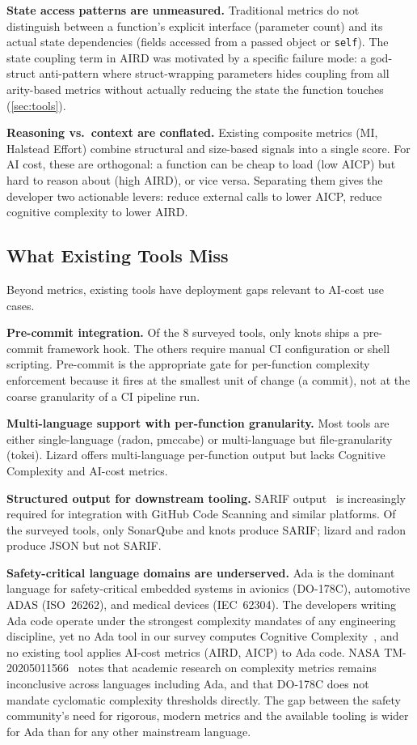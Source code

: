 \documentclass[10pt,twocolumn,letterpaper]{article}
\begin{document}
\textbf{State access patterns are unmeasured.}  Traditional metrics do not
distinguish between a function's explicit interface (parameter count) and
its actual state dependencies (fields accessed from a passed object or
\texttt{self}).  The state coupling term in AIRD was motivated by a
specific failure mode: a god-struct anti-pattern where struct-wrapping
parameters hides coupling from all arity-based metrics without actually
reducing the state the function touches
(\cref{sec:tools}).

\textbf{Reasoning vs.\ context are conflated.}  Existing composite metrics
(MI, Halstead Effort) combine structural and size-based signals into a
single score.  For AI cost, these are orthogonal: a function can be cheap
to load (low AICP) but hard to reason about (high AIRD), or vice versa.
Separating them gives the developer two actionable levers: reduce external
calls to lower AICP, reduce cognitive complexity to lower AIRD.

\subsection{What Existing Tools Miss}

Beyond metrics, existing tools have deployment gaps relevant to AI-cost
use cases.

\textbf{Pre-commit integration.}  Of the 8 surveyed tools, only knots
ships a pre-commit framework hook.  The others require manual CI
configuration or shell scripting.  Pre-commit is the appropriate gate
for per-function complexity enforcement because it fires at the smallest
unit of change (a commit), not at the coarse granularity of a CI pipeline
run.

\textbf{Multi-language support with per-function granularity.}  Most
tools are either single-language (radon, pmccabe) or multi-language but
file-granularity (tokei).  Lizard offers multi-language per-function
output but lacks Cognitive Complexity and AI-cost metrics.

\textbf{Structured output for downstream tooling.}  SARIF
output~\cite{sarif} is increasingly required for integration with GitHub
Code Scanning and similar platforms.  Of the surveyed tools, only SonarQube
and knots produce SARIF; lizard and radon produce JSON but not SARIF.

\textbf{Safety-critical language domains are underserved.}  Ada is the
dominant language for safety-critical embedded systems in avionics
(DO-178C), automotive ADAS (ISO~26262), and medical devices (IEC~62304).
The developers writing Ada code operate under the strongest complexity
mandates of any engineering discipline, yet no Ada tool in our survey
computes Cognitive Complexity~\cite{cognitive-complexity}, and no
existing tool applies AI-cost metrics (AIRD, AICP) to Ada code.
NASA TM-20205011566~\cite{nasa-cc-study} notes that academic research
on complexity metrics remains inconclusive across languages including Ada,
and that DO-178C does not mandate cyclomatic complexity thresholds directly.
The gap between the safety community's need for rigorous, modern metrics and
the available tooling is wider for Ada than for any other mainstream language.
\end{document}
